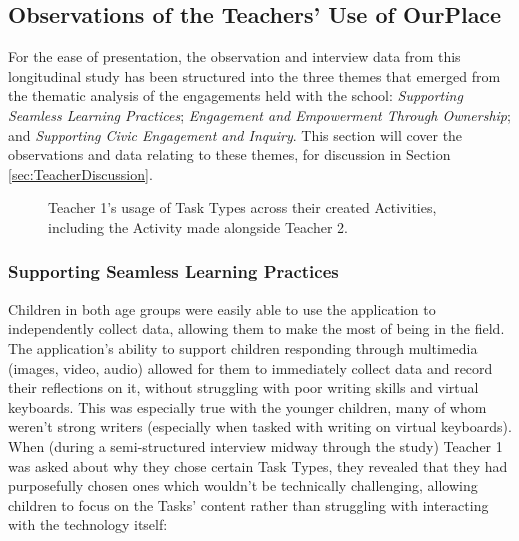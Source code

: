 \subsection{Observations of the Teachers' Use of OurPlace}

For the ease of presentation, the observation and interview data from this longitudinal study has been structured into the three themes that emerged from the thematic analysis of the engagements held with the school: \textit{Supporting Seamless Learning Practices}; \textit{Engagement and Empowerment Through Ownership}; and \textit{Supporting Civic Engagement and Inquiry}. This section will cover the observations and data relating to these themes, for discussion in Section \ref{sec:TeacherDiscussion}.

\begin{figure}
    \centering
    \caption[Teacher 1's usage of Task Types across their created Activities]{Teacher 1's usage of Task Types across their created Activities, including the Activity made alongside Teacher 2.}
    \label{fig:TaskTypeUsage}
\end{figure}

\subsubsection{Supporting Seamless Learning Practices}

Children in both age groups were easily able to use the application to independently collect data, allowing them to make the most of being in the field. The application's ability to support children responding through multimedia (images, video, audio) allowed for them to immediately collect data and record their reflections on it, without struggling with poor writing skills and virtual keyboards. This was especially true with the younger children, many of whom weren't strong writers (especially when tasked with writing on virtual keyboards). When (during a semi-structured interview midway through the study) Teacher 1 was asked about why they chose certain Task Types, they revealed that they had purposefully chosen ones which wouldn't be technically challenging, allowing children to focus on the Tasks' content rather than struggling with interacting with the technology itself: 

